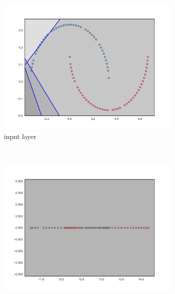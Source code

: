 \begin{figure}
\begin{subfigure}[b]{0.3\textwidth}
        \label{fig:reluBNInit502}
    \end{subfigure}
    \\
    \begin{subfigure}[b]{0.3\textwidth}
        \includegraphics[width=\textwidth]{img/init/layerwise/conv2d_1-0.pdf}
        \caption{\SepLayer input layer}
        \label{fig:layerwiseInitInput}
    \end{subfigure}
    ~ %
    \begin{subfigure}[b]{0.3\textwidth}
        \includegraphics[width=\textwidth]{img/init/layerwise/conv2d_50-0.pdf}

\end{subfigure}
\end{figure}

